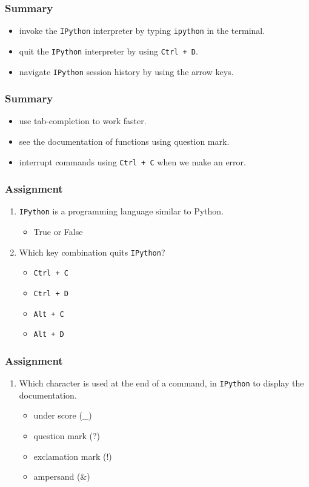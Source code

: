 \documentclass[17pt]{beamer}
\newcounter{saveenumi}
\newcommand{\seti}{\setcounter{saveenumi}{\value{enumi}}}
\newcommand{\conti}{\setcounter{enumi}{\value{saveenumi}}}
\begin{document}
\begin{frame}
\frametitle{Summary}
\begin{itemize}
\item invoke the \texttt{IPython} interpreter by typing \texttt{ipython} in the terminal.\pause
\item quit the \texttt{IPython} interpreter by using \texttt{Ctrl + D}.\pause
\item navigate \texttt{IPython} session history by using the arrow keys.
\end{itemize}
\end{frame}
\begin{frame}
\frametitle{Summary}
\begin{itemize}
\item use tab-completion to work faster.\pause
\item see the documentation of functions using question mark.\pause
\item interrupt commands using \texttt{Ctrl + C} when we make an error.
\end{itemize}
\end{frame}
\begin{frame}
\frametitle{Assignment}
\begin{enumerate}
\item \texttt{IPython} is a programming language similar to Python.
\begin{itemize}
\item True or False\pause
\end{itemize}
\item Which key combination quits \texttt{IPython}?
\begin{itemize}
\item \texttt{Ctrl + C}
\item \texttt{Ctrl + D}
\item \texttt{Alt + C}
\item \texttt{Alt + D}
	\seti
\end{itemize}
\end{enumerate}
\end{frame}
\begin{frame}
\frametitle{Assignment}
\begin{enumerate}
	\conti
\item Which character is used at the end of a command, in \texttt{IPython} to
display the documentation.
\begin{itemize}
\item under score (\_)
\item question mark (?)
\item exclamation mark (!)
\item ampersand (\&)
\end{itemize}
\end{enumerate}
\end{frame}
\end{document}
